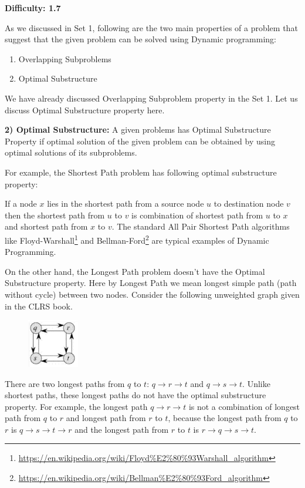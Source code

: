 \textbf{Difficulty: 1.7}

As we discussed in Set 1, following are the two main properties of a problem
that suggest that the given problem can be solved using Dynamic programming:
\begin{enumerate}[label=\textbf{\arabic*.}]
\item Overlapping Subproblems
\item Optimal Substructure
\end{enumerate}

We have already discussed Overlapping Subproblem property in the Set 1. Let
us discuss Optimal Substructure property here.

\textbf{2) Optimal Substructure:} A given problems has Optimal Substructure
Property if optimal solution of the given problem can be obtained by using
optimal solutions of its subproblems.

For example, the Shortest Path problem has following optimal substructure
property:

If a node $x$ lies in the shortest path from a source node $u$ to
destination node $v$ then the shortest path from $u$ to $v$ is combination
of shortest path from $u$ to $x$ and shortest path from $x$ to $v$. The
standard All Pair Shortest Path algorithms like
Floyd-Warshall\footnote{\url{https://en.wikipedia.org/wiki/Floyd\%E2\%80\%93Warshall\_algorithm}}
and
Bellman-Ford\footnote{\url{https://en.wikipedia.org/wiki/Bellman\%E2\%80\%93Ford\_algorithm}}
are typical examples of Dynamic Programming.

On the other hand, the Longest Path problem doesn't have the Optimal
Substructure property. Here by Longest Path we mean longest simple path
(path without cycle) between two nodes. Consider the following unweighted
graph given in the CLRS book. 

\begin{figure}
\centering
\includegraphics[width=0.2\textwidth]{Images/DPLongestPath}
\label{DPLongestPath}
\end{figure}

There are two longest paths from $q$ to $t$:
$q\to r\to t$ and $q\to s\to t$. Unlike shortest paths, these longest paths
do not have the optimal substructure property. For example, the longest path
$q\to r\to t$ is not a combination of longest path from $q$ to $r$ and
longest path from $r$ to $t$, because the longest path from $q$ to $r$ is
$q\to s\to t\to r$ and the longest path from $r$ to $t$ is $r\to q\to s\to
t$.

